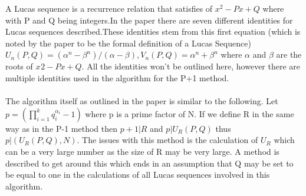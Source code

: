 \documentclass[12pt]{article} %
\begin{document}
\indent A Lucas sequence is a recurrence relation that satisfies of $x^2 - Px+Q$ where with P and Q being integers.In the paper there are seven different identities for Lucas sequences described.These identities stem from this first equation (which is noted by the paper to be the formal definition of a Lucas Sequence)  $U_n(P,Q) = (\alpha^{n}-\beta^{n})/(\alpha-\beta), V_n(P,Q) = \alpha^{n}+\beta^{n}$ where $\alpha$ and $\beta$  are the roots of $x^{}2 - Px+Q$. All the identities won't be outlined here, however there are multiple identities used in the algorithm for the P+1 method. 
\\\\
\indent The algorithm itself as outlined in the paper is similar to the following. Let $p = (\prod^{k}_{i=1}q^{\alpha_i}_i - 1)$ where p is a prime factor of N. If we define R in the same way as in the P-1 method then $p+1|R$ and $p|U_R(P,Q)$ thus $p|(U_R(P,Q),N)$. The issues with this method is the calculation of $U_R$ which can be a very large number as the size of R may be very large. A method is described to get around this which ends in an assumption that Q may be set to be equal to one in the calculations of all Lucas sequences involved in this algorithm. 
\\\\
\end{document}
